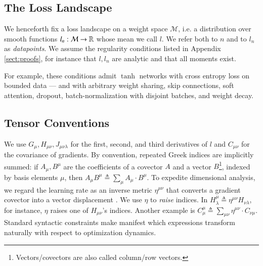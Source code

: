 \documentclass{article}
\theoremstyle{plain}
\theoremstyle{definition}
\newcommand{\Mm}{\mathcal{M}}
\begin{document}

    \subsection{The Loss Landscape}


        We henceforth fix a loss landscape on a weight space $\Mm$, i.e. a
        distribution over smooth functions $l_n:\Mm\to\RR$ whose mean we call
        $l$.  We refer both to $n$ and to $l_n$ as \emph{datapoints}.
        We assume the regularity conditions listed in Appendix
        \ref{sect:proofs}, for instance that $l, l_n$ are analytic and that all
        moments exist.


        For example, these conditions admit $\tanh$ networks with cross entropy
        loss on bounded data --- and with arbitrary weight sharing, skip
        connections, soft attention, dropout, batch-normalization with disjoint
        batches, and weight decay.
        

    \subsection{Tensor Conventions}
        We use $G_\mu, H_{\mu\nu}, J_{\mu\nu\lambda}$ for the first, second,
        and third derivatives of $l$ and $C_{\mu \nu}$ for the covariance of
        gradients.  By convention, repeated Greek indices are implicitly
        summed: if $A_\mu, B^\mu$ are the coefficients of a covector $A$ and a
        vector
        $B$\footnote{
            Vectors/covectors are also called column/row vectors.
        }, indexed by basis elements $\mu$, then
        $
            A_\mu B^\mu
            \triangleq
            \sum_\mu A_\mu \cdot B^\mu
        $.
        To expedite dimensional analysis, we regard the learning rate as an
        inverse metric $\eta^{\mu\nu}$ that converts a gradient covector into a
        vector displacement \citep{bo13}.  We use $\eta$ to \emph{raise}
        indices.  In
        $
            H^{\mu}_{\lambda}
            \triangleq
            \eta^{\mu\nu} H_{\nu\lambda}
        $, for instance,
        $\eta$ raises one of $H_{\mu\nu}$'s indices.  Another example is
        $
            C^{\mu}_{\mu}
            \triangleq
            \sum_{\mu \nu} \eta^{\mu\nu} \cdot C_{\nu\mu}
        $.
        Standard syntactic constraints make manifest which expressions
        transform naturally with respect to optimization dynamics.  
\end{document}
